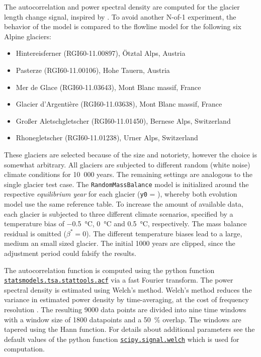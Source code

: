        The autocorrelation and power spectral density are computed for the glacier length change signal, inspired by \citep{Roe2014}. To avoid another N-of-1 experiment, the behavior of the \vas{} model is compared to the flowline model for the following six Alpine glaciers:
        \begin{itemize}
            \item Hintereisferner (RGI60-11.00897), Ötztal Alps, Austria
            \item Pasterze (RGI60-11.00106), Hohe Tauern, Austria
            \item Mer de Glace (RGI60-11.03643), Mont Blanc massif, France
            \item Glacier d'Argentière (RGI60-11.03638), Mont Blanc massif, France
            \item Großer Aletschgletscher (RGI60-11.01450), Bernese Alps, Switzerland
            \item Rhonegletscher (RGI60-11.01238), Urner Alps, Switzerland
        \end{itemize}
        These glaciers are selected because of the size and notoriety, however the choice is somewhat arbitrary. All glaciers are subjected to different random (white noise) climate conditions for 10\ 000 years. The remaining settings are analogous to the single glacier test case. The \lstinline`RandomMassBalance` model is initialized around the respective \textit{equilibrium year} for each glacier (\lstinline`y0` = \tstar), whereby both evolution model use the same \tstar{} reference table.
        To increase the amount of available data, each glacier is subjected to three different climate scenarios, specified by a temperature bias of \SI{-0.5}{\celsius}, \SI{0}{\celsius} and \SI{+0.5}{\celsius}, respectively. The mass balance residual is omitted ($\beta^* = 0$). The different temperature biases lead to a large, medium an small sized glacier. The initial 1000 years are clipped, since the adjustment period could falsify the results.

        The autocorrelation function is computed using the python function \href{https://www.statsmodels.org/devel/generated/statsmodels.tsa.stattools.acf.html}{\lstinline`statsmodels.tsa.stattools.acf`} via a fast Fourier transform. The power spectral density is estimated using Welch's method. Welch's method reduces the variance in  estimated power density by time-averaging, at the cost of frequency resolution \citep[e.g.,][]{Welch1967, Proakis2007}.  The resulting 9000 data points are divided into nine time windows with a window size of 1800 datapoints and a \SI{50}{\percent} overlap. The windows are tapered using the Hann function. For details about additional parameters see the default values of the python function \href{https://docs.scipy.org/doc/scipy/reference/generated/scipy.signal.welch.html}{\lstinline`scipy.signal.welch`} which is used for computation.
    
